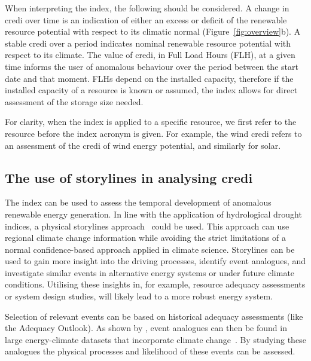 \documentclass[12pt]{iopart}
\newcommand{\credi}[0]{{\sc credi}}
\newcommand{\wdi}[0]{{\sc wind credi}}
\begin{document}
When interpreting the index, the following should be considered. 
A change in \credi{} over time is an indication of either an excess or deficit of the renewable resource potential with respect to its climatic normal (Figure~\ref{fig:overview}b). 
A stable \credi{} over a period indicates nominal renewable resource potential with respect to its climate. 
The value of \credi{}, in Full Load Hours (FLH), at a given time informs the user of anomalous behaviour over the period between the start date and that moment. 
FLHs depend on the installed capacity, therefore if the installed capacity of a resource is known or assumed, the index allows for direct assessment of the storage size needed.

For clarity, when the index is applied to a specific resource, we first refer to the resource before the index acronym is given. 
For example, the \wdi{} refers to an assessment of the \credi{} of wind energy potential, and similarly for solar.




\subsection{The use of storylines in analysing \credi }\label{secCP2:storylines}
The index can be used to assess the temporal development of anomalous renewable energy generation. 
In line with the application of hydrological drought indices, a physical storylines approach~\parencite{Shepherd2019,vanderWiel2021} could be used. 
This approach can use regional climate change information while avoiding the strict limitations of a normal confidence-based approach applied in climate science. 
Storylines can be used to gain more insight into the driving processes, identify event analogues, and investigate similar events in alternative energy systems or under future climate conditions. 
Utilising these insights in, for example, resource adequacy assessments or system design studies, will likely lead to a more robust energy system.

Selection of relevant events can be based on historical adequacy assessments (like the \parencite{tennet2023} Adequacy Outlook). 
As shown by \textcite{vanderwiel2019extreme,vanderWiel2021}, event analogues can then be found in large energy-climate datasets that incorporate climate change~\parencite{craig2022disconnect,Dubus2022PECD}. 
By studying these analogues the physical processes and likelihood of these events can be assessed.
\end{document}
